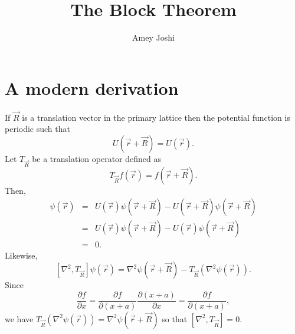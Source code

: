 \documentclass{article}
\title{The Block Theorem}
\begin{document}
\author{Amey Joshi}
\maketitle
\section{A modern derivation}\label{s1}
If $\vec{R}$ is a translation vector in the primary lattice then the potential
function is periodic such that
\begin{equation}\label{e1}
U(\vec{r} + \vec{R}) = U(\vec{r}).
\end{equation}
Let $T_{\vec{R}}$ be a translation operator defined as
\begin{equation}\label{e2}
T_{\vec{R}} f(\vec{r}) = f(\vec{r} + \vec{R}).
\end{equation}
Then,
\begin{eqnarray*}
[U, T_{\vec{R}}]\psi(\vec{r}) &=& 
U(\vec{r})\psi(\vec{r} + \vec{R})-U(\vec{r} + \vec{R})\psi(\vec{r} + \vec{R}) \\
&=& U(\vec{r})\psi(\vec{r} + \vec{R}) - U(\vec{r}) \psi(\vec{r} + \vec{R}) \\
&=& 0.
\end{eqnarray*}
Likewise,
\[
[\nabla^2, T_{\vec{R}}]\psi(\vec{r}) = \nabla^2\psi(\vec{r} + \vec{R}) - 
T_{\vec{R}}\left(\nabla^2 \psi(\vec{r})\right).
\]
Since
\[
\frac{\partial f}{\partial x} = \frac{\partial f}{\partial (x+a)}
\frac{\partial (x+a)}{\partial x} = \frac{\partial f}{\partial (x+a)},
\]
we have $T_{\vec{R}}\left(\nabla^2 \psi(\vec{r})\right) = \nabla^2 \psi(\vec{r}
+ \vec{R})$ so that $[\nabla^2, T_{\vec{R}}] = 0$.
\end{document}
